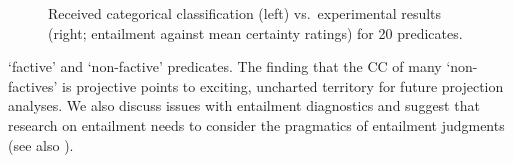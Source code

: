 \documentclass[12pt,fleqn]{article}
\newcommand{\6}{\mbox{$[\hspace*{-.6mm}[$}}
\newcommand{\9}{\mbox{$]\hspace*{-.6mm}]$}}
\begin{document}
\begin{figure}
\caption{Received categorical classification (left) vs.\ experimental results (right; entailment against mean certainty ratings) for 20 predicates.}\label{f-summary-categorical}

\end{figure}

\noindent
`factive' and `non-factive' predicates.  The finding that the CC of many `non-factives' is projective points to exciting, uncharted territory for future projection analyses. We also discuss issues with entailment diagnostics and suggest that research on entailment needs to consider the pragmatics of entailment judgments (see also \cite{demarneffe-etal2012}).

%
%
%

\newpage


\end{document}
